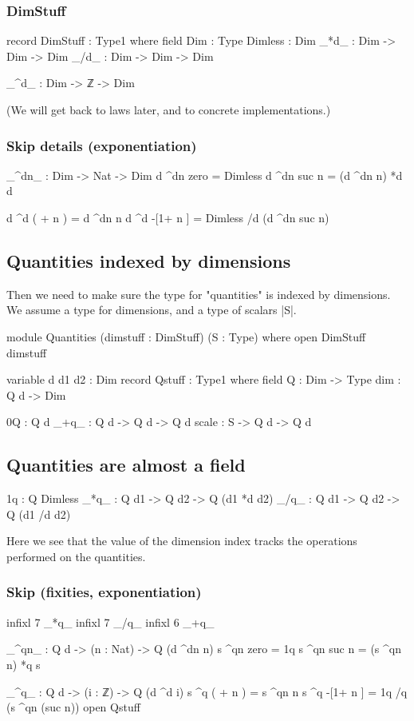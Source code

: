 \documentclass{article}
\begin{document}
\subsubsection{DimStuff}
\label{sec:orgb0d530a}
\begin{code}
record DimStuff : Type1 where
  field
    Dim : Type
    Dimless : Dim
    _*d_  : Dim -> Dim -> Dim
    _/d_  : Dim -> Dim -> Dim

  _^d_ : Dim -> ℤ -> Dim
\end{code}
(We will get back to laws later, and to concrete implementations.)
\subsubsection{Skip details (exponentiation)}
\label{sec:org8b0821f}
\begin{code}
  _^dn_ : Dim -> Nat -> Dim
  d ^dn zero   = Dimless
  d ^dn suc n  = (d ^dn n) *d d

  d ^d  ( + n )  = d ^dn n
  d ^d -[1+ n ]  = Dimless /d (d ^dn suc n)
\end{code}
\subsection{Quantities indexed by dimensions}
\label{sec:org0cd7662}
Then we need to make sure the type for "quantities" is indexed by
dimensions. We assume a type for dimensions, and a type of
scalars |S|.
\begin{code}
module Quantities (dimstuff : DimStuff) (S : Type) where
  open DimStuff dimstuff

  variable d d1 d2 : Dim
  record Qstuff : Type1 where
    field
      Q      : Dim -> Type
      dim    : Q d -> Dim

      0Q     : Q d
      _+q_   : Q d  -> Q d  -> Q d
      scale  : S    -> Q d  -> Q d
\end{code}
\subsection{Quantities are almost a field}
\label{sec:org0c728a2}
\begin{code}
      1q    : Q Dimless
      _*q_  : Q d1 -> Q d2 -> Q (d1 *d d2)
      _/q_  : Q d1 -> Q d2 -> Q (d1 /d d2)
\end{code}

Here we see that the value of the dimension index tracks the
operations performed on the quantities.

\subsubsection{Skip (fixities, exponentiation)}
\label{sec:orgd136fdd}
\begin{code}
    infixl 7 _*q_
    infixl 7 _/q_
    infixl 6 _+q_

    _^qn_ : Q d -> (n : Nat) -> Q (d ^dn n)
    s ^qn zero   = 1q
    s ^qn suc n  = (s ^qn n) *q s

    _^q_ : Q d -> (i : ℤ) -> Q (d ^d i)
    s ^q  ( + n )  = s ^qn n
    s ^q -[1+ n ]  = 1q /q (s ^qn (suc n))
  open Qstuff
\end{code}
\end{document}
